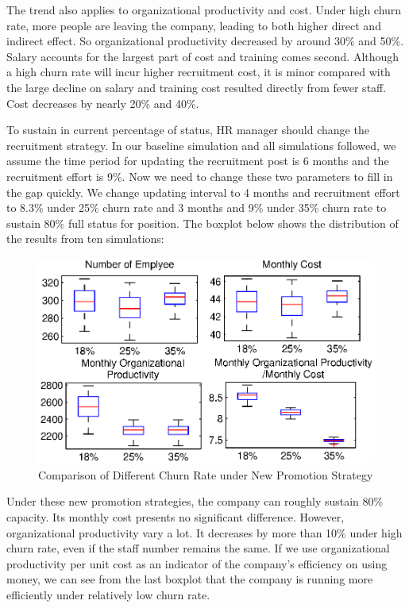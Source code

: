 \documentclass[tcn = 37075, sheet = false, abstract = false]{mcmthesis}
\begin{document}
The trend also applies to organizational productivity and cost. Under high churn rate, more people are leaving the company, leading to  both higher direct and indirect effect. So organizational productivity decreased by around 30\% and 50\%. Salary accounts for the largest part of cost and training comes second. Although a high churn rate will incur higher recruitment cost, it is minor compared with the large decline on salary and training cost resulted directly from fewer staff. Cost decreases by nearly 20\% and 40\%.

To sustain in current percentage of status, HR manager should change the recruitment strategy. In our baseline simulation and all simulations followed, we assume the time period for updating the recruitment post is 6 months and the recruitment effort is 9\%. Now we need to change these two parameters to fill in the gap quickly. We change updating interval to 4 months and recruitment effort to 8.3\% under 25\% churn rate and 3 months and 9\% under 35\% churn rate to sustain 80\% full status for position. The boxplot below shows the distribution of the results from ten simulations:

\begin{figure}[htb!]
\centering
\includegraphics[width=15cm]{Task4_2.eps}
\caption{Comparison of Different Churn Rate under New Promotion Strategy} 
\label{fig:2}
\end{figure}

Under these new promotion strategies, the company can roughly sustain 80\% capacity. Its monthly cost presents no significant difference. However, organizational productivity vary a lot. It decreases by more than 10\% under high churn rate, even if the staff number remains the same. If we use organizational productivity per unit cost as an indicator of the company's efficiency on using money, we can see from the last boxplot that the company is running more efficiently under relatively low churn rate.
\end{document}
